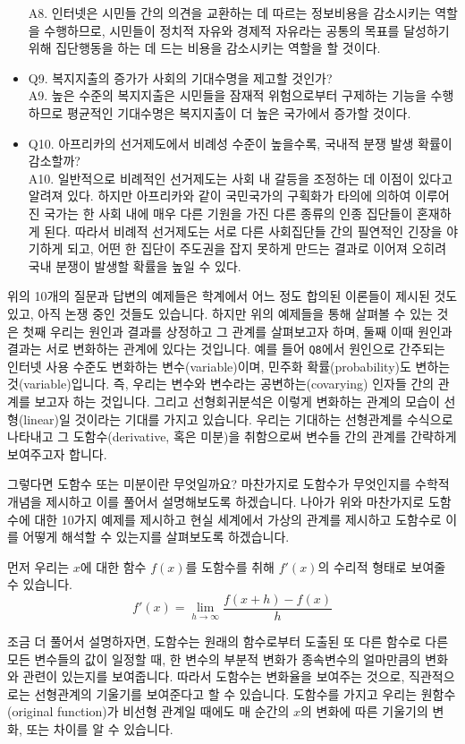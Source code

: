 \documentclass[
]{book}
\begin{document}
\begin{itemize}
  A8. 인터넷은 시민들 간의 의견을 교환하는 데 따르는 정보비용을 감소시키는 역할을 수행하므로, 시민들이 정치적 자유와 경제적 자유라는 공통의 목표를 달성하기 위해 집단행동을 하는 데 드는 비용을 감소시키는 역할을 할 것이다.
\item
  Q9. 복지지출의 증가가 사회의 기대수명을 제고할 것인가?\\
  A9. 높은 수준의 복지지출은 시민들을 잠재적 위험으로부터 구제하는 기능을 수행하므로 평균적인 기대수명은 복지지출이 더 높은 국가에서 증가할 것이다.
\item
  Q10. 아프리카의 선거제도에서 비례성 수준이 높을수록, 국내적 분쟁 발생 확률이 감소할까?\\
  A10. 일반적으로 비례적인 선거제도는 사회 내 갈등을 조정하는 데 이점이 있다고 알려져 있다. 하지만 아프리카와 같이 국민국가의 구획화가 타의에 의하여 이루어진 국가는 한 사회 내에 매우 다른 기원을 가진 다른 종류의 인종 집단들이 혼재하게 된다. 따라서 비례적 선거제도는 서로 다른 사회집단들 간의 필연적인 긴장을 야기하게 되고, 어떤 한 집단이 주도권을 잡지 못하게 만드는 결과로 이어져 오히려 국내 분쟁이 발생할 확률을 높일 수 있다.
\end{itemize}

위의 10개의 질문과 답변의 예제들은 학계에서 어느 정도 합의된 이론들이 제시된 것도 있고, 아직 논쟁 중인 것들도 있습니다. 하지만 위의 예제들을 통해 살펴볼 수 있는 것은 첫째 우리는 원인과 결과를 상정하고 그 관계를 살펴보고자 하며, 둘째 이때 원인과 결과는 서로 변화하는 관계에 있다는 것입니다. 예를 들어 \texttt{Q8}에서 원인으로 간주되는 인터넷 사용 수준도 변화하는 변수(variable)이며, 민주화 확률(probability)도 변하는 것(variable)입니다. 즉, 우리는 변수와 변수라는 공변하는(covarying) 인자들 간의 관계를 보고자 하는 것입니다. 그리고 선형회귀분석은 이렇게 변화하는 관계의 모습이 선형(linear)일 것이라는 기대를 가지고 있습니다. 우리는 기대하는 선형관계를 수식으로 나타내고 그 도함수(derivative, 혹은 미분)을 취함으로써 변수들 간의 관계를 간략하게 보여주고자 합니다.

그렇다면 도함수 또는 미분이란 무엇일까요? 마찬가지로 도함수가 무엇인지를 수학적 개념을 제시하고 이를 풀어서 설명해보도록 하겠습니다. 나아가 위와 마찬가지로 도함수에 대한 10가지 예제를 제시하고 현실 세계에서 가상의 관계를 제시하고 도함수로 이를 어떻게 해석할 수 있는지를 살펴보도록 하겠습니다.

먼저 우리는 \(x\)에 대한 함수 \(f(x)\)를 도함수를 취해 \(f'(x)\)의 수리적 형태로 보여줄 수 있습니다.\[f'(x) = \lim_{h\to\infty}\frac{f(x+h)-f(x)}{h}\]

조금 더 풀어서 설명하자면, 도함수는 원래의 함수로부터 도출된 또 다른 함수로 다른 모든 변수들의 값이 일정할 때, 한 변수의 부분적 변화가 종속변수의 얼마만큼의 변화와 관련이 있는지를 보여줍니다. 따라서 도함수는 변화율을 보여주는 것으로, 직관적으로는 선형관계의 기울기를 보여준다고 할 수 있습니다. 도함수를 가지고 우리는 원함수(original function)가 비선형 관계일 때에도 매 순간의 \(x\)의 변화에 따른 기울기의 변화, 또는 차이를 알 수 있습니다.
\end{document}
